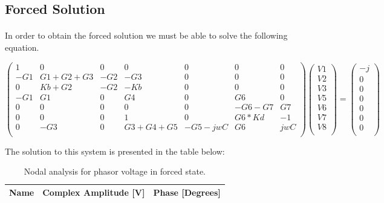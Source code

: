 \subsection{Forced Solution}

\paragraph{} In order to obtain the forced solution we must be able to solve the following equation.  

\begin{equation}
\begin{pmatrix}
1 & 0 & 0 & 0 & 0 & 0 & 0\\
-G1 & G1+G2+G3 & -G2 & -G3 & 0 & 0 & 0\\
0 & Kb+G2 & -G2 & -Kb & 0 & 0 & 0\\
-G1 & G1 & 0 & G4 & 0 & G6 & 0\\
0 & 0 & 0 & 0 & 0 & -G6-G7 & G7\\
0 & 0 & 0 & 1 & 0 & G6*Kd & -1\\
0 & -G3 & 0 & G3+G4+G5 & -G5-jwC & G6 & jwC\\
\end{pmatrix}
\begin{pmatrix}
V1\\
V2\\
V3\\
V5\\
V6\\
V7\\
V8\\
\end{pmatrix}
=
\begin{pmatrix}
-j\\
0\\
0\\
0\\
0\\
0\\
0\\
\end{pmatrix}
\end{equation}


The solution to this system is presented in the table below:


\begin{table}[h]
  \centering
  \begin{tabular}{|l|r|r|}
    \hline    
    {\bf Name} & {\bf Complex Amplitude [V]} & {\bf Phase [Degrees]}\\ \hline
     
  \end{tabular}
  \caption{Nodal analysis for phasor voltage in forced state.}
  \label{tab:phasor}
\end{table}


